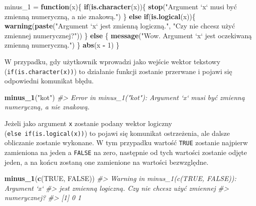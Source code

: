 \documentclass[paper=6in:9in,pagesize=pdftex,headinclude=on,footinclude=on,10pt]{scrbook}
\newenvironment{Shaded}{\begin{snugshade}}{\end{snugshade}}
\newcommand{\CommentTok}[1]{\textcolor[rgb]{0.56,0.35,0.01}{\textit{#1}}}
\newcommand{\ControlFlowTok}[1]{\textcolor[rgb]{0.13,0.29,0.53}{\textbf{#1}}}
\newcommand{\DecValTok}[1]{\textcolor[rgb]{0.00,0.00,0.81}{#1}}
\newcommand{\KeywordTok}[1]{\textcolor[rgb]{0.13,0.29,0.53}{\textbf{#1}}}
\newcommand{\NormalTok}[1]{#1}
\newcommand{\OperatorTok}[1]{\textcolor[rgb]{0.81,0.36,0.00}{\textbf{#1}}}
\newcommand{\OtherTok}[1]{\textcolor[rgb]{0.56,0.35,0.01}{#1}}
\newcommand{\StringTok}[1]{\textcolor[rgb]{0.31,0.60,0.02}{#1}}
\begin{document}
\begin{Shaded}
\begin{Highlighting}[]
\NormalTok{minus_}\DecValTok{1}\NormalTok{ =}\StringTok{ }\ControlFlowTok{function}\NormalTok{(x)\{}
  \ControlFlowTok{if}\NormalTok{(}\KeywordTok{is.character}\NormalTok{(x))\{}
    \KeywordTok{stop}\NormalTok{(}\StringTok{"Argument `x` musi być zmienną numeryczną, a nie znakową."}\NormalTok{)}
\NormalTok{  \} }\ControlFlowTok{else} \ControlFlowTok{if}\NormalTok{(}\KeywordTok{is.logical}\NormalTok{(x))\{}
    \KeywordTok{warning}\NormalTok{(}\KeywordTok{paste}\NormalTok{(}\StringTok{"Argument `x` jest zmienną logiczną."}\NormalTok{,}
                  \StringTok{"Czy nie chcesz użyć zmiennej numerycznej?"}\NormalTok{))}
\NormalTok{  \} }\ControlFlowTok{else}\NormalTok{ \{}
    \KeywordTok{message}\NormalTok{(}\StringTok{"Wow. Argument `x` jest oczekiwaną zmienną numeryczną."}\NormalTok{)}
\NormalTok{  \}}
  \KeywordTok{abs}\NormalTok{(x }\OperatorTok{-}\StringTok{ }\DecValTok{1}\NormalTok{)}
\NormalTok{\}}
\end{Highlighting}
\end{Shaded}

W przypadku, gdy użytkownik wprowadzi jako wejście wektor tekstowy (\texttt{if(is.character(x))}) to działanie funkcji zostanie przerwane i pojawi się odpowiedni komunikat błędu.

\begin{Shaded}
\begin{Highlighting}[]
\KeywordTok{minus_1}\NormalTok{(}\StringTok{"kot"}\NormalTok{)}
\CommentTok{#> Error in minus_1("kot"): Argument `x` musi być zmienną numeryczną, a nie znakową.}
\end{Highlighting}
\end{Shaded}

Jeżeli jako argument \texttt{x} zostanie podany wektor logiczny (\texttt{else\ if(is.logical(x))}) to pojawi się komunikat ostrzeżenia, ale dalsze obliczanie zostanie wykonane.
W tym przypadku wartość \texttt{TRUE} zostanie najpierw zamieniona na jeden a \texttt{FALSE} na zero, następnie od tych wartości zostanie odjęte jeden, a na końcu zostaną one zamienione na wartości bezwzględne.

\begin{Shaded}
\begin{Highlighting}[]
\KeywordTok{minus_1}\NormalTok{(}\KeywordTok{c}\NormalTok{(}\OtherTok{TRUE}\NormalTok{, }\OtherTok{FALSE}\NormalTok{))}
\CommentTok{#> Warning in minus_1(c(TRUE, FALSE)): Argument `x`}
\CommentTok{#> jest zmienną logiczną. Czy nie chcesz użyć zmiennej}
\CommentTok{#> numerycznej?}
\CommentTok{#> [1] 0 1}
\end{Highlighting}
\end{Shaded}
\end{document}
